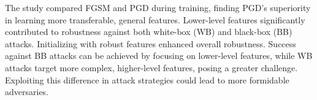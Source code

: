 \documentclass{article}
\begin{document}
\setlength{\parskip}{10pt}
\begingroup
\raggedright
The study compared FGSM and PGD during training, finding PGD's superiority in learning more transferable, general features. Lower-level features significantly contributed to robustness against both white-box (WB) and black-box (BB) attacks. Initializing with robust features enhanced overall robustness. Success against BB attacks can be achieved by focusing on lower-level features, while WB attacks target more complex, higher-level features, posing a greater challenge. Exploiting this difference in attack strategies could lead to more formidable adversaries. \cite{davchev2019empirical}
\endgroup





\end{document}
